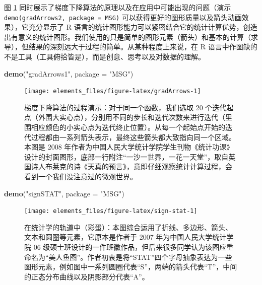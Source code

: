 \documentclass[
  b5paper,
  UTF8,twoside]{book}
\newenvironment{Shaded}{\begin{snugshade}}{\end{snugshade}}
\newcommand{\AttributeTok}[1]{\textcolor[rgb]{0.13,0.29,0.53}{#1}}
\newcommand{\FunctionTok}[1]{\textcolor[rgb]{0.13,0.29,0.53}{\textbf{#1}}}
\newcommand{\NormalTok}[1]{#1}
\newcommand{\StringTok}[1]{\textcolor[rgb]{0.31,0.60,0.02}{#1}}
\begin{document}
图 \ref{fig:gradArrows} 同时展示了梯度下降算法的原理以及在应用中可能出现的问题（演示 \texttt{demo(\textquotesingle{}gradArrows2\textquotesingle{},\ package\ =\ \textquotesingle{}MSG\textquotesingle{})} 可以获得更好的图形质量以及箭头动画效果），它充分显示了 R 语言的统计图形能力可以紧密结合它的统计计算优势，创造出有意义的统计图形。我们使用的只是简单的图形元素（箭头）和基本的计算（求导），但结果的深刻远大于过程的简单。从某种程度上来说，在 R 语言中作图缺的不是工具（工具俯拾皆是），而是创意、思考以及对数据的理解。

\begin{Shaded}
\begin{Highlighting}[]
\FunctionTok{demo}\NormalTok{(}\StringTok{"gradArrows1"}\NormalTok{, }\AttributeTok{package =} \StringTok{"MSG"}\NormalTok{)}
\end{Highlighting}
\end{Shaded}

\begin{figure}

{\centering \texttt{[image: elements\_files/figure-latex/gradArrows-1]} 

}

\caption[ 梯度下降算法的过程演示 ]{梯度下降算法的过程演示：对于同一个函数，我们选取 20 个迭代起点（外围大实心点），分别用不同的步长和迭代次数来进行迭代（里围相应颜色的小实心点为迭代终止位置）。从每一个起始点开始的迭代过程都由一系列箭头表示，最终这些箭头都大致指向同一个区域。本图是 2008 年作者为中国人民大学统计学院学生刊物《统计功课》设计的封面图形，底部一行附注``一沙一世界，一花一天堂''，取自英国诗人布莱克的诗《天真的预言》，意即仔细观察统计计算过程，会看到一个我们没注意过的微观世界。}\label{fig:gradArrows}
\end{figure}



\begin{Shaded}
\begin{Highlighting}[]
\FunctionTok{demo}\NormalTok{(}\StringTok{"signSTAT"}\NormalTok{, }\AttributeTok{package =} \StringTok{"MSG"}\NormalTok{)}
\end{Highlighting}
\end{Shaded}

\begin{figure}

{\centering \texttt{[image: elements\_files/figure-latex/sign-stat-1]} 

}

\caption[ 在统计学的轨道中（彩蛋）]{在统计学的轨道中（彩蛋）：本图综合运用了折线、多边形、箭头、文本和圆圈等元素，它原本是作者于 2007 年为中国人民大学统计学院 06 级硕士班设计的一件班徽作品，但后来很多同学认为该图应重命名为``美人鱼图''。作者初衷是将``STAT''四个字母抽象表达为一些图形元素，例如图中一系列圆圈代表``S''，两端的箭头代表``T''，中间的正态分布曲线以及阴影部分代表``A''。}\label{fig:sign-stat}
\end{figure}
\end{document}
